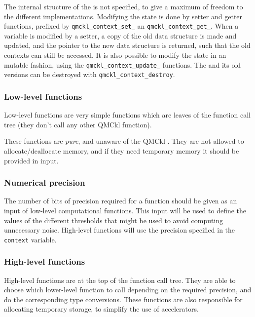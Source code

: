 The internal structure of the {\context}  is not specified, to give a
maximum of  freedom to  the different  implementations.  Modifying
the  state   is  done   by  setter   and  getter functions,   prefixed  by
\texttt{qmckl_context_set_}  an
\texttt{qmckl_context_get_}.
When a {\context} variable is modified by a setter, a copy of the old
data structure is made and updated, and the pointer to the new data
structure is returned, such that the old contexts can still be
accessed.  It is also possible to modify the state in an mutable
fashion, using the \texttt{qmckl_context_update_} functions.
The {\context} and its old versions can be destroyed with
\texttt{qmckl_context_destroy}.


\subsubsection{Low-level functions}

Low-level functions are very simple  functions which are leaves of
the function call tree (they don't call any other \ac{QMCkl} function).

These  functions   are   \emph{pure},   and  unaware   of   the   \ac{QMCkl}
{\context}. They are not allowed to allocate/deallocate memory, and
if they need temporary memory it should be provided in input.

\subsubsection{Numerical precision}

The number of bits of precision  required for a function should be
given as an input of low-level computational functions. This input
will be used to define the values of the different thresholds that
might be  used to  avoid computing unnecessary  noise.  High-level
functions  will  use  the  precision specified  in  the  \texttt{context}
variable.

\subsubsection{High-level functions}

High-level functions  are at  the top of  the function  call tree.
They  are  able  to  choose which  lower-level  function  to  call
depending on the required precision, and do the corresponding type
conversions.  These functions are  also responsible for allocating
temporary storage, to simplify the use of accelerators.

